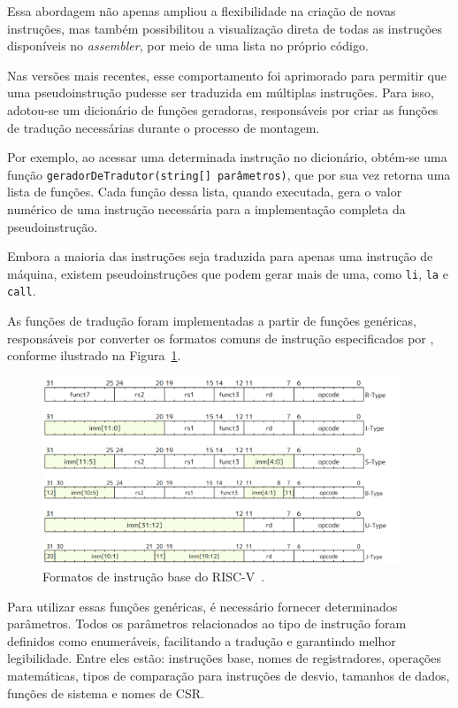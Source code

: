 \documentclass[
	12pt,				%
	openright,			%
	oneside,			%
	a4paper,			%
	english,			%
	french,				%
	spanish,			%
	brazil,				%
	]{abntex2}
\begin{document}
Essa abordagem não apenas ampliou a flexibilidade na criação de novas instruções, mas também possibilitou a visualização direta de todas as instruções disponíveis no \textit{assembler}, por meio de uma lista no próprio código.

Nas versões mais recentes, esse comportamento foi aprimorado para permitir que uma pseudoinstrução pudesse ser traduzida em múltiplas instruções. Para isso, adotou-se um dicionário de funções geradoras, responsáveis por criar as funções de tradução necessárias durante o processo de montagem.

Por exemplo, ao acessar uma determinada instrução no dicionário, obtém-se uma função \texttt{geradorDeTradutor(string[] parâmetros)}, que por sua vez retorna uma lista de funções. Cada função dessa lista, quando executada, gera o valor numérico de uma instrução necessária para a implementação completa da pseudoinstrução.

Embora a maioria das instruções seja traduzida para apenas uma instrução de máquina, existem pseudoinstruções que podem gerar mais de uma, como \texttt{li}, \texttt{la} e \texttt{call}.

As funções de tradução foram implementadas a partir de funções genéricas, responsáveis por converter os formatos comuns de instrução especificados por , conforme ilustrado na Figura~\ref{fig:InstructionFormatRISCV}.

\begin{figure}[h]
    \centering
    \includegraphics[width=0.95\textwidth]{ProcessoDesenvolvimento/Assembler/InstructionFormat.png}
    \caption{Formatos de instrução base do RISC-V~\cite{risc-v_risc-v_2024}.}
    \label{fig:InstructionFormatRISCV}
\end{figure}

Para utilizar essas funções genéricas, é necessário fornecer determinados parâmetros. Todos os parâmetros relacionados ao tipo de instrução foram definidos como enumeráveis, facilitando a tradução e garantindo melhor legibilidade. Entre eles estão: instruções base, nomes de registradores, operações matemáticas, tipos de comparação para instruções de desvio, tamanhos de dados, funções de sistema e nomes de CSR.
\end{document}
